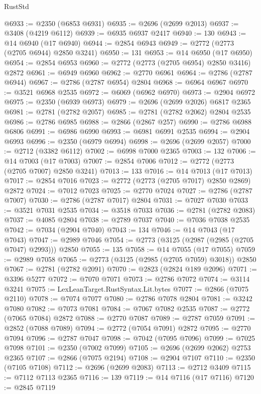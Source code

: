 \begin{lexlean}{RustStd}
\begin{coremodule}
@6933 := @2350 (@6853 @6931)
@6935 := @2696 (@2699 @2013)
@6937 := @3408 (@4219 @6112)
@6939 := @6935 @6937 @2417
@6940 := 130
@6943 := @14 @6940 (@17 @6940)
@6944 := @2854 @6943
@6949 := @2772 (@2773 (@2705 @6944) @2850 @3241)
@6950 := 131
@6953 := @14 @6950 (@17 @6950)
@6954 := @2854 @6953
@6960 := @2772 (@2773 (@2705 @6954) @2850 @3416) @2872
@6961 := @6949 @6960
@6962 := @2770 @6961
@6964 := @2786 (@2787 @6944)
@6967 := @2786 (@2787 @6954) @2804
@6968 := @6964 @6967
@6970 := @3521 @6968 @2535
@6972 := @6069 (@6962 @6970)
@6973 := @2904 @6972
@6975 := @2350 (@6939 @6973)
@6979 := @2696 (@2699 @2026) @6817 @2365
@6981 := @2781 (@2782 @2057)
@6985 := @2781 (@2782 @2062) @2804 @2535
@6986 := @2786 @6985
@6988 := @2866 (@2867 @257)
@6990 := @2786 @6988 @6806
@6991 := @6986 @6990
@6993 := @6981 @6991 @2535
@6994 := @2904 @6993
@6996 := @2350 (@6979 @6994)
@6998 := @2696 (@2699 @2057)
@7000 := @2712 (@3382 @6112)
@7002 := @6998 @7000 @2365
@7003 := 132
@7006 := @14 @7003 (@17 @7003)
@7007 := @2854 @7006
@7012 := @2772 (@2773 (@2705 @7007) @2850 @3241)
@7013 := 133
@7016 := @14 @7013 (@17 @7013)
@7017 := @2854 @7016
@7023 := @2772 (@2773 (@2705 @7017) @2850 @2869) @2872
@7024 := @7012 @7023
@7025 := @2770 @7024
@7027 := @2786 (@2787 @7007)
@7030 := @2786 (@2787 @7017) @2804
@7031 := @7027 @7030
@7033 := @3521 @7031 @2535
@7034 := @3518 @7033
@7036 := @2781 (@2782 @2083)
@7037 := @4085 @2804
@7038 := @2789 @7037
@7040 := @7036 @7038 @2535
@7042 := @7034 (@2904 @7040)
@7043 := 134
@7046 := @14 @7043 (@17 @7043)
@7047 := @2989 @7046
@7054 := @2773 (@3125 (@2987 (@2985 (@2705 @7047) @2993))) @2850
@7055 := 135
@7058 := @14 @7055 (@17 @7055)
@7059 := @2989 @7058
@7065 := @2773 (@3125 (@2985 (@2705 @7059) @3018)) @2850
@7067 := @2781 (@2782 @2091)
@7070 := @2823 (@2824 @189 @2096)
@7071 := @3396 @5277
@7072 := @7070 @7071
@7073 := @2786 @7072
@7074 := @3114 @3241
@7075 := LexLeanTarget.RustSyntax.Lit.bytes
@7077 := @2866 (@7075 @2110)
@7078 := @7074 @7077
@7080 := @2786 @7078 @2804
@7081 := @3242 @7080
@7082 := @7073 @7081
@7084 := @7067 @7082 @2535
@7087 := @2772 (@7065 @7084) @2872
@7088 := @2770 @7087
@7089 := @2787 @7059
@7091 := @2852 (@7088 @7089)
@7094 := @2772 (@7054 @7091) @2872
@7095 := @2770 @7094
@7096 := @2787 @7047
@7098 := @7042 (@7095 @7096)
@7099 := @7025 @7098
@7101 := @2350 (@7002 @7099)
@7105 := @2696 (@2699 @2062) @2753 @2365
@7107 := @2866 (@7075 @2194)
@7108 := @2904 @7107
@7110 := @2350 (@7105 @7108)
@7112 := @2696 (@2699 @2083)
@7113 := @2712 @3409
@7115 := @7112 @7113 @2365
@7116 := 139
@7119 := @14 @7116 (@17 @7116)
@7120 := @2845 @7119

\end{coremodule}
\end{lexlean}
